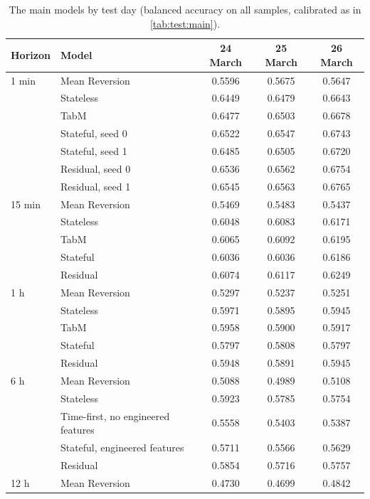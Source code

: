 \begin{table}[t]
\centering
\caption{The main models by test day (balanced accuracy on all samples, calibrated as in
\cref{tab:test:main}).}
\label{tab:test:days}
\small
\begin{fittable}\begin{tabular}{llccc}
\toprule
Horizon & Model & 24 March & 25 March & 26 March \\
\midrule
1 min  & Mean Reversion & 0.5596 & 0.5675 & 0.5647 \\
       & Stateless      & 0.6449 & 0.6479 & 0.6643 \\
       & TabM           & 0.6477 & 0.6503 & 0.6678 \\
       & Stateful, seed 0 & 0.6522 & 0.6547 & 0.6743 \\
       & Stateful, seed 1 & 0.6485 & 0.6505 & 0.6720 \\
       & Residual, seed 0 & 0.6536 & 0.6562 & 0.6754 \\
       & Residual, seed 1 & 0.6545 & 0.6563 & 0.6765 \\
\midrule
15 min & Mean Reversion & 0.5469 & 0.5483 & 0.5437 \\
       & Stateless      & 0.6048 & 0.6083 & 0.6171 \\
       & TabM           & 0.6065 & 0.6092 & 0.6195 \\
       & Stateful       & 0.6036 & 0.6036 & 0.6186 \\
       & Residual       & 0.6074 & 0.6117 & 0.6249 \\
\midrule
1 h    & Mean Reversion & 0.5297 & 0.5237 & 0.5251 \\
       & Stateless      & 0.5971 & 0.5895 & 0.5945 \\
       & TabM           & 0.5958 & 0.5900 & 0.5917 \\
       & Stateful       & 0.5797 & 0.5808 & 0.5797 \\
       & Residual       & 0.5948 & 0.5891 & 0.5945 \\
\midrule
6 h    & Mean Reversion & 0.5088 & 0.4989 & 0.5108 \\
       & Stateless      & 0.5923 & 0.5785 & 0.5754 \\
       & Time-first, no engineered features & 0.5558 & 0.5403 & 0.5387 \\
       & Stateful, engineered features & 0.5711 & 0.5566 & 0.5629 \\
       & Residual       & 0.5854 & 0.5716 & 0.5757 \\
\midrule
12 h   & Mean Reversion & 0.4730 & 0.4699 & 0.4842 \\

\end{tabular}
\end{fittable}
\end{table}
